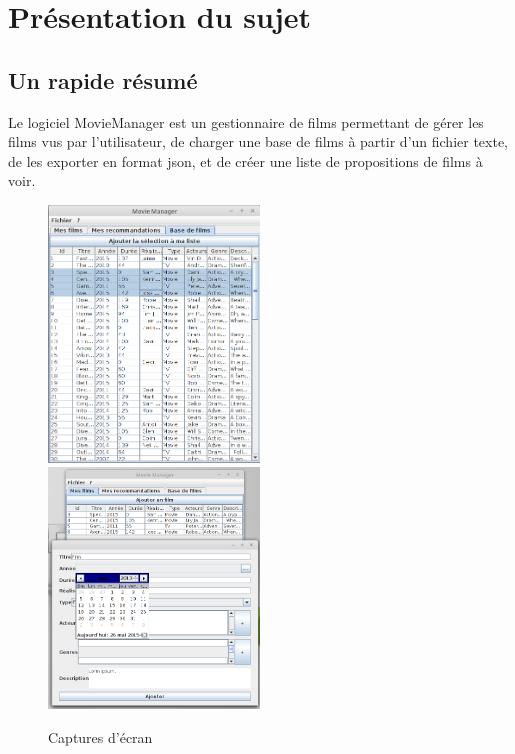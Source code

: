 \section{Présentation du sujet} %

\subsection{Un rapide résumé}
Le logiciel MovieManager est un gestionnaire de films permettant de gérer les films vus par l'utilisateur, de charger une base de films à partir d'un fichier texte, de les exporter en format json, et de créer une liste de propositions de films à voir.

\begin{figure}[!ht]
    \includegraphics[width=0.5\textwidth]{./images/snapshot1.png}
    \includegraphics[width=0.5\textwidth]{./images/snapshot2.png}
    \caption{Captures d'écran}
\end{figure}

